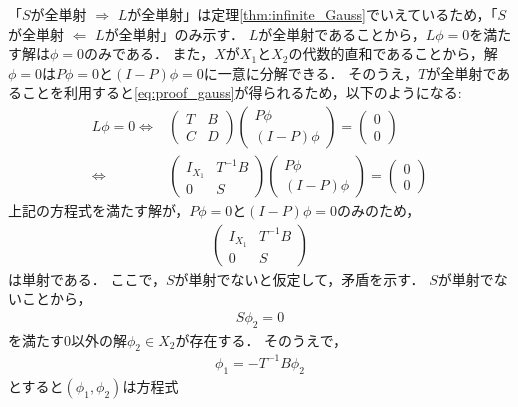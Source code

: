 \begin{Proof}
「$S$が全単射 $\Rightarrow$ $L$が全単射」は定理\ref{thm:infinite_Gauss}でいえているため，「$S$が全単射 $\Leftarrow$ $L$が全単射」のみ示す．
$L$が全単射であることから，$L \phi = 0$を満たす解は$\phi = 0$のみである．
また，$X$が$X_1$と$X_2$の代数的直和であることから，解$\phi = 0$は$P \phi = 0$と$(I - P)\phi = 0$に一意に分解できる．
そのうえ，$T$が全単射であることを利用すると\eqref{eq:proof_gauss}が得られるため，以下のようになる:
\begin{align*}
	L \phi = 0 \Leftrightarrow& \left( \begin{array}{cc}
		T & B \\
		C & D
	\end{array} \right)\left( \begin{array}{c}
		P \phi \\
		(I - P) \phi
	\end{array} \right) = \left( \begin{array}{c}
		0 \\
		0
	\end{array} \right) \\
	\Leftrightarrow& \left( \begin{array}{cc}
		I_{X_1} & T^{-1} B \\
		0 & S
	\end{array} \right) \left( \begin{array}{c}
		P \phi \\
		(I - P) \phi
	\end{array} \right) = \left( \begin{array}{c}
		0 \\
		0
	\end{array} \right)
\end{align*}
上記の方程式を満たす解が，$P \phi = 0$と$(I - P)\phi = 0$のみのため，
\begin{align*}
	\left( \begin{array}{cc}
		I_{X_1} & T^{-1} B \\
		0 & S
	\end{array} \right)
\end{align*}
は単射である．
ここで，$S$が単射でないと仮定して，矛盾を示す．
$S$が単射でないことから，
\begin{align*}
	S \phi_2 = 0 
\end{align*}
を満たす$0$以外の解$\phi_2 \in X_2$が存在する．
そのうえで，
\begin{align*}
	\phi_1 = -T^{-1} B \phi_2
\end{align*}
とすると$( \phi_1, \phi_2 )$は方程式

\end{Proof}

